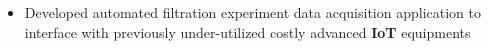 \documentclass[10.5pt]{res} %
\begin{document}
\begin{resume}
\begin{itemize}
    	\item Developed automated filtration experiment data acquisition application to interface with previously under-utilized costly advanced \textbf{IoT} equipments %
    \end{itemize}

\end{resume}
\end{document}
